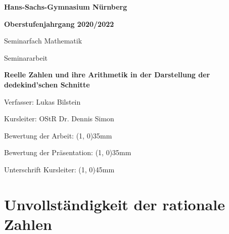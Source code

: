\documentclass[12pt]{article}
\begin{document}
    \thispagestyle{empty}

    {
        \centering

        \begin{singlespace}

        \textbf{Hans-Sachs-Gymnasium Nürnberg}

        \textbf{Oberstufenjahrgang 2020/2022}

        \end{singlespace}

        \bigskip

        Seminarfach Mathematik

        \bigskip

        Seminararbeit

        \bigskip
        \bigskip

        \textbf{Reelle Zahlen und ihre Arithmetik in der Darstellung der dedekind'schen Schnitte}

        \bigskip
        \bigskip

    }

    \hspace*{30mm}Verfasser: \hspace*{22mm} Lukas Bilstein

    \bigskip

    \hspace*{30mm}Kursleiter: \hspace*{20mm} OStR Dr. Dennis Simon

    \bigskip

    \hspace*{30mm}Bewertung der Arbeit: \hspace*{10mm} \line(1, 0){35mm}

    \bigskip

    \hspace*{30mm}Bewertung der Präsentation: \line(1, 0){35mm}

    \bigskip
    \bigskip
    \bigskip
    \bigskip
    \bigskip

    \hspace*{30mm}Unterschrift Kursleiter: \hspace*{8mm} \line(1, 0){45mm}

    \newpage

    \thispagestyle{empty}

    \tableofcontents

    \newpage

    \setcounter{page}{3}

    \section{Unvollständigkeit der rationale Zahlen}
\end{document}
